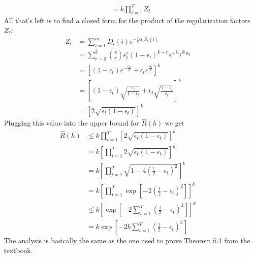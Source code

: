 \documentclass{article}
\begin{document}
\begin{enumerate}[(a)]
\begin{align*}
        &=k \prod_{t=1}^T Z_t
    \end{align*}
    All that's left is to find a closed form for the product of the regularization factors $Z_t$:
    \begin{align*}
        Z_t &= \sum_{i=1}^mD_t(i)e^{-\frac{1}{k}\alpha_t S_t(i)}\\
        &= \sum_{r=0}^k \binom{k}{r} \epsilon_t^r (1-\epsilon_t)^{k-r} e^{-\frac{k-2r}{k}\alpha_t} \\
        &= \left[(1-\epsilon_t)e^{-\frac{\alpha_t}{k}} + \epsilon_t e^{\frac{\alpha_t}{k}}\right]^k\\
        &= \left[(1-\epsilon_t)\sqrt{\frac{\epsilon_t}{1-\epsilon_t}} + \epsilon_t \sqrt{\frac{1-\epsilon_t}{\epsilon_t}}\right]^k\\
        &= \left[2\sqrt{\epsilon_t(1-\epsilon_t)}\right]^k
    \end{align*}
    Plugging this value into the upper bound for $\widehat{R}(h)$ we get
    \begin{align*}
        \widehat{R}(h) &\leq k \prod_{t=1}^T \left[2\sqrt{\epsilon_t(1-\epsilon_t)}\right]^k \\
        &= k \left[\prod_{t=1}^T 2\sqrt{\epsilon_t(1-\epsilon_t)}\right]^k \\
        &= k \left[\prod_{t=1}^T \sqrt{1 - 4\left(\frac{1}{2}-\epsilon_t\right)^2}\right]^k \\
        &= k \left[\prod_{t=1}^T \exp \left[-2 \left(\frac{1}{2}-\epsilon_t\right)^2\right]\right]^k \\
        &\leq k \left[\exp\left[-2\sum_{t=1}^T \left(\frac{1}{2}-\epsilon_t\right)^2\right]\right]^k\\
        &= k \exp\left[-2k\sum_{t=1}^T \left(\frac{1}{2}-\epsilon_t\right)^2\right]
    \end{align*}
    The analysis is basically the same as the one used to prove Theorem 6.1 from the textbook.
\end{enumerate}
\end{document}
